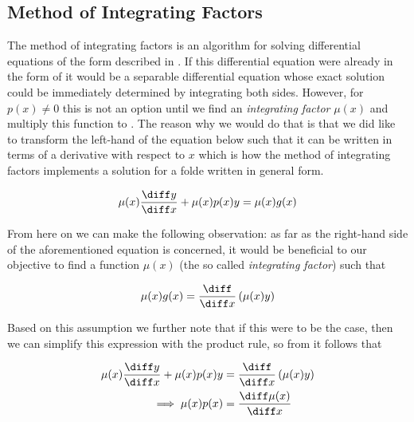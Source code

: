 \subsection{Method of Integrating Factors}\label{subsec-meth-of-int-factors}

\begin{flushleft}
	The method of integrating factors is an algorithm for solving differential equations
	of the form described in . If this differential
	equation were already in the form of  it
	would be a separable differential equation whose exact solution could be immediately
	determined by integrating both sides. However, for $p(x)\neq0$ this is not an option
	until we find an \emph{integrating factor} $\mu(x)$ and multiply this function to
	. The reason why we would do that is that we did
	like to transform the left-hand of the equation below such that it can be written
	in terms of a derivative with respect to $x$ which is how the method of integrating
	factors implements a solution for a \gls{folde} written	in general form.
\end{flushleft}

\begin{equation*}
	\mu(x)\frac{\diff y}{\diff x} + \mu(x)p(x)y = \mu(x)g(x)
\end{equation*}

\begin{flushleft}
	From here on we can make the following observation: as far as the right-hand
	side of the	aforementioned equation is concerned, it would be beneficial to our
	objective to find a function $\mu(x)$ (the so called \emph{integrating factor})
	such that
\end{flushleft}

\begin{equation}\label{eq-meth-of-int-factors-tmp1}
	\mu(x)g(x) = \frac{\diff}{\diff x}\left(\mu(x)y\right)
\end{equation}

\begin{flushleft}
	Based on this assumption we further note that if this were to be the
	case, then we can simplify this expression with the product rule, so from
	 it follows that
\end{flushleft}

\begin{align*}
	\mu(x)\frac{\diff y}{\diff x} + \mu(x)p(x)y & = \frac{\diff}{\diff x}\left(\mu(x)y\right) \\
	\implies \mu(x)p(x)                         & = \frac{\diff \mu(x)}{\diff x}
\end{align*}

